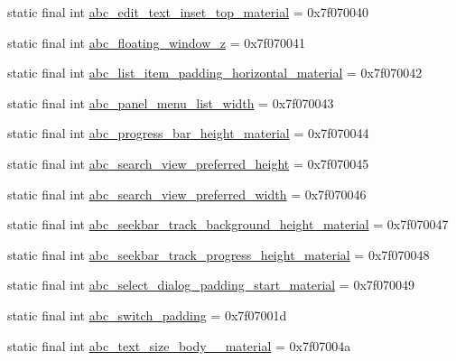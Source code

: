 \begin{CompactItemize}
\item 
static final int \hyperlink{classcom_1_1companyname_1_1x__2doo_1_1_r_1_1dimen_cb94dd83b109069b9a391a08ea64d4f0}{abc\_\-edit\_\-text\_\-inset\_\-top\_\-material} = 0x7f070040
\item 
static final int \hyperlink{classcom_1_1companyname_1_1x__2doo_1_1_r_1_1dimen_c637e36525a369af690bf2713367e33f}{abc\_\-floating\_\-window\_\-z} = 0x7f070041
\item 
static final int \hyperlink{classcom_1_1companyname_1_1x__2doo_1_1_r_1_1dimen_345495a8bcf3d16127143bcc3073882a}{abc\_\-list\_\-item\_\-padding\_\-horizontal\_\-material} = 0x7f070042
\item 
static final int \hyperlink{classcom_1_1companyname_1_1x__2doo_1_1_r_1_1dimen_7117f7236d1afa7faf709f5da004b6fe}{abc\_\-panel\_\-menu\_\-list\_\-width} = 0x7f070043
\item 
static final int \hyperlink{classcom_1_1companyname_1_1x__2doo_1_1_r_1_1dimen_0be33bd2b90fbfc07486fa18be281a1f}{abc\_\-progress\_\-bar\_\-height\_\-material} = 0x7f070044
\item 
static final int \hyperlink{classcom_1_1companyname_1_1x__2doo_1_1_r_1_1dimen_cbf2d1dfa5e497c88ebba03c434018d4}{abc\_\-search\_\-view\_\-preferred\_\-height} = 0x7f070045
\item 
static final int \hyperlink{classcom_1_1companyname_1_1x__2doo_1_1_r_1_1dimen_4820e2f4f85a47f5c694d70ee23a01b0}{abc\_\-search\_\-view\_\-preferred\_\-width} = 0x7f070046
\item 
static final int \hyperlink{classcom_1_1companyname_1_1x__2doo_1_1_r_1_1dimen_6b29b501668c360625c9a47ad781064a}{abc\_\-seekbar\_\-track\_\-background\_\-height\_\-material} = 0x7f070047
\item 
static final int \hyperlink{classcom_1_1companyname_1_1x__2doo_1_1_r_1_1dimen_c4918dec9387ac726434daad98089e95}{abc\_\-seekbar\_\-track\_\-progress\_\-height\_\-material} = 0x7f070048
\item 
static final int \hyperlink{classcom_1_1companyname_1_1x__2doo_1_1_r_1_1dimen_5e154ba521495c3bf5cbde4a7d03763a}{abc\_\-select\_\-dialog\_\-padding\_\-start\_\-material} = 0x7f070049
\item 
static final int \hyperlink{classcom_1_1companyname_1_1x__2doo_1_1_r_1_1dimen_c42107013504473b2aaa8c492980ce97}{abc\_\-switch\_\-padding} = 0x7f07001d
\item 
static final int \hyperlink{classcom_1_1companyname_1_1x__2doo_1_1_r_1_1dimen_c1de349d76a0e7851bf7018adc5d4af1}{abc\_\-text\_\-size\_\-body\_\_\-material} = 0x7f07004a

\end{CompactItemize}
